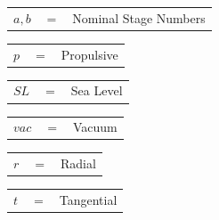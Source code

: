 \begin{tabular}{p{0.8cm}p{0.8cm}p{5.6cm}}
	$a,b$ & $=$ & Nominal Stage Numbers\\
\end{tabular} 
\begin{tabular}{p{0.8cm}p{0.8cm}p{5.6cm}}
	$p$ & $=$ & Propulsive\\
\end{tabular} 
\begin{tabular}{p{0.8cm}p{0.8cm}p{5.6cm}}
	$SL$ & $=$ & Sea Level\\
\end{tabular} 
\begin{tabular}{p{0.8cm}p{0.8cm}p{5.6cm}}
	$vac$ & $=$ & Vacuum\\
\end{tabular} 
\begin{tabular}{p{0.8cm}p{0.8cm}p{5.6cm}}
	$r$ & $=$ & Radial\\
\end{tabular} 
\begin{tabular}{p{0.8cm}p{0.8cm}p{5.6cm}}
	$t$ & $=$ & Tangential\\
\end{tabular} 

